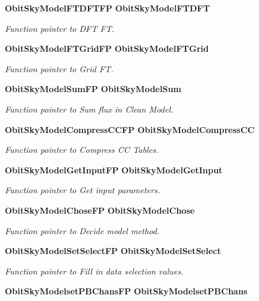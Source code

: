 \begin{CompactItemize}
{\bf Obit\-Sky\-Model\-FTDFTFP} {\bf Obit\-Sky\-Model\-FTDFT}
\begin{CompactList}\small\item\em Function pointer to DFT FT. \item\end{CompactList}\item 
{\bf Obit\-Sky\-Model\-FTGrid\-FP} {\bf Obit\-Sky\-Model\-FTGrid}
\begin{CompactList}\small\item\em Function pointer to Grid FT. \item\end{CompactList}\item 
{\bf Obit\-Sky\-Model\-Sum\-FP} {\bf Obit\-Sky\-Model\-Sum}
\begin{CompactList}\small\item\em Function pointer to Sum flux in Clean Model. \item\end{CompactList}\item 
{\bf Obit\-Sky\-Model\-Compress\-CCFP} {\bf Obit\-Sky\-Model\-Compress\-CC}
\begin{CompactList}\small\item\em Function pointer to Compress CC Tables. \item\end{CompactList}\item 
{\bf Obit\-Sky\-Model\-Get\-Input\-FP} {\bf Obit\-Sky\-Model\-Get\-Input}
\begin{CompactList}\small\item\em Function pointer to Get input parameters. \item\end{CompactList}\item 
{\bf Obit\-Sky\-Model\-Chose\-FP} {\bf Obit\-Sky\-Model\-Chose}
\begin{CompactList}\small\item\em Function pointer to Decide model method. \item\end{CompactList}\item 
{\bf Obit\-Sky\-Model\-Set\-Select\-FP} {\bf Obit\-Sky\-Model\-Set\-Select}
\begin{CompactList}\small\item\em Function pointer to Fill in data selection values. \item\end{CompactList}\item 
{\bf Obit\-Sky\-Modelset\-PBChans\-FP} {\bf Obit\-Sky\-Modelset\-PBChans}

\end{CompactItemize}
